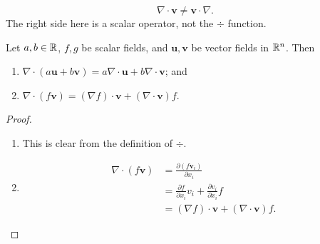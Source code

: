\begin{remark}
    \[ \nabla \cdot \bm v \neq \bm v \cdot \nabla. \]
    The right side here is a scalar operator, not the $\div$ function.
\end{remark}

\begin{proposition}
    Let $a, b \in \mathbb{R}$, $f, g$ be scalar fields, and $\bm u, \bm v$ be vector fields in $\mathbb{R}^n$. Then
    \begin{enumerate}
        \item $\nabla \cdot (a \bm u + b \bm v) = a \nabla \cdot \bm u + b \nabla \cdot \bm v$; and
        \item $\nabla \cdot (f \bm v) = (\nabla f) \cdot \bm v + (\nabla \cdot \bm v) f$.
    \end{enumerate}
\end{proposition}

\begin{proof}
    \begin{enumerate}
        \item This is clear from the definition of $\div$.
        \item
            \begin{align*}
                \nabla \cdot (f \bm v) &= \frac{\partial (f\bm v_i)}{\partial x_i} \\
                                       &= \frac{\partial f}{\partial x_i} v_i + \frac{\partial v_i}{\partial x_i} f \\
                                       &= (\nabla f) \cdot \bm v + (\nabla \cdot \bm v) f.
            \end{align*}
    \end{enumerate}
\end{proof}
